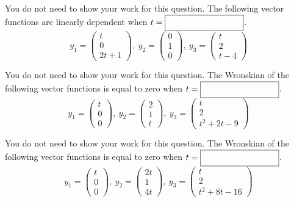 \ifnum {}    
\question[2] You do not need to show your work for this question. The following vector functions are linearly dependent when $t = \framebox{\strut\hspace{3cm}}$. 
$$y_1 = \begin{pmatrix} t\\0\\2t+1\end{pmatrix}, \ y_2 = \begin{pmatrix} 0\\1\\0\end{pmatrix}, \ y_3 = \begin{pmatrix} t\\2\\t-4 \end{pmatrix}$$
\fi



\ifnum {}
\question[2] You do not need to show your work for this question. The Wronskian of the following vector functions is equal to zero when $t = \framebox{\strut\hspace{3cm}}$. 
$$y_1 = \begin{pmatrix} t\\0\\0\end{pmatrix}, \ y_2 = \begin{pmatrix} 2\\1\\t\end{pmatrix}, \ y_3 = \begin{pmatrix} t\\2\\t^2+2t-9 \end{pmatrix}$$
\fi



\ifnum {}
\question[2] You do not need to show your work for this question. The Wronskian of the following vector functions is equal to zero when $t = \framebox{\strut\hspace{3cm}}$. 
$$y_1 = \begin{pmatrix} t\\0\\0\end{pmatrix}, \ y_2 = \begin{pmatrix} 2t\\1\\4t\end{pmatrix}, \ y_3 = \begin{pmatrix} t\\2\\t^2+8t-16 \end{pmatrix}$$
\fi



